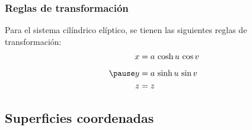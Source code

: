 \documentclass[12pt]{beamer}
\begin{document}
\begin{frame}
\frametitle{Reglas de transformación}
Para el sistema cilíndrico elíptico, se tienen las siguientes reglas de transformación:
\pause
\begin{eqnarray}
\begin{aligned}
x &= a \, \cosh u \, \cos v \\[0.5em] \pause
y &= a \, \sinh u \, \sin v \\
z &= z
\end{aligned}
\label{eq:ecuacion_02_73_esp}
\end{eqnarray}
\end{frame}

\subsection{Superficies coordenadas}
\end{document}
